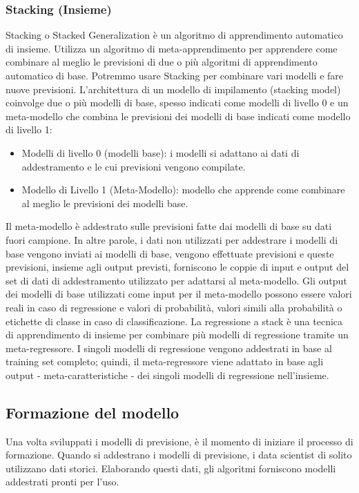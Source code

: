 \documentclass[12pt,a4paper]{report}
\begin{document}
\subsubsection{Stacking (Insieme)}
Stacking o Stacked Generalization è un algoritmo di apprendimento automatico di insieme. Utilizza un algoritmo di meta-apprendimento per apprendere come combinare al meglio le previsioni di due o più algoritmi di apprendimento automatico di base.
Potremmo usare Stacking per combinare vari modelli e fare nuove previsioni.
L'architettura di un modello di impilamento (stacking model) coinvolge due o più modelli di base, spesso indicati come modelli di livello 0 e un meta-modello che combina le previsioni dei modelli di base indicati come modello di livello 1:
\begin{itemize}
\item Modelli di livello 0 (modelli base): i modelli si adattano ai dati di addestramento e le cui previsioni vengono compilate.
\item Modello di Livello 1 (Meta-Modello): modello che apprende come combinare al meglio le previsioni dei modelli base.
\end{itemize}
Il meta-modello è addestrato sulle previsioni fatte dai modelli di base su dati fuori campione. In altre parole, i dati non utilizzati per addestrare i modelli di base vengono inviati ai modelli di base, vengono effettuate previsioni e queste previsioni, insieme agli output previsti, forniscono le coppie di input e output del set di dati di addestramento utilizzato per adattarsi al meta-modello. Gli output dei modelli di base utilizzati come input per il meta-modello possono essere valori reali in caso di regressione e valori di probabilità, valori simili alla probabilità o etichette di classe in caso di classificazione.
La regressione a stack è una tecnica di apprendimento di insieme per combinare più modelli di regressione tramite un meta-regressore. I singoli modelli di regressione vengono addestrati in base al training set completo; quindi, il meta-regressore viene adattato in base agli output - meta-caratteristiche - dei singoli modelli di regressione nell'insieme.


\subsection{Formazione del modello}
Una volta sviluppati i modelli di previsione, è il momento di iniziare il processo di formazione. Quando si addestrano i modelli di previsione, i data scientist di solito utilizzano dati storici. Elaborando questi dati, gli algoritmi forniscono modelli addestrati pronti per l'uso.
\end{document}
